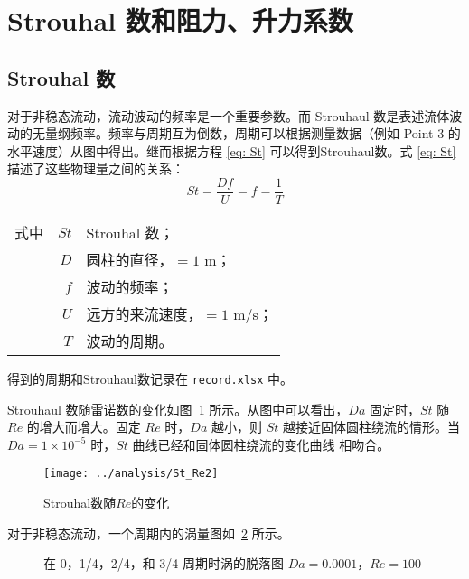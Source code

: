 \section{Strouhal 数和阻力、升力系数}

\subsection{Strouhal 数}

对于非稳态流动，流动波动的频率是一个重要参数。而 Strouhaul 数是表述流体波动的无量纲频率。频率与周期互为倒数，周期可以根据测量数据（例如 Point 3 的水平速度）从图中得出。继而根据方程 \eqref{eq: St} 可以得到Strouhaul数。式 \eqref{eq: St} 描述了这些物理量之间的关系：
\begin{equation}\label{eq: St}
	St = \frac{Df}{U} = f = \frac{1}{T}
\end{equation}
\begin{tabularx}{\textwidth}{@{}l@{\quad}r@{——}X@{}}
	式中 & $St$ & Strouhal 数；\\
		& $D$ & 圆柱的直径，$=1$ m；\\
		& $f$ & 波动的频率；\\
		& $U$ & 远方的来流速度，$=1$ m/s；\\
		& $T$ & 波动的周期。 
\end{tabularx}\vspace{3.15bp}
得到的周期和Strouhaul数记录在 \texttt{record.xlsx} 中。

Strouhaul 数随雷诺数的变化如图~\ref{fig: St} 所示。从图中可以看出，$Da$ 固定时，$St$ 随 $Re$ 的增大而增大。固定 $Re$ 时，$Da$ 越小，则 $St$ 越接近固体圆柱绕流的情形。当 $Da=1 \times 10^{-5}$ 时，$St$ 曲线已经和固体圆柱绕流的变化曲线 \cite{} 相吻合。

\begin{figure}
	\centering
	\texttt{[image: ../analysis/St\_Re2]}
	\caption{Strouhal数随$Re$的变化}
	\label{fig: St}
\end{figure}

对于非稳态流动，一个周期内的涡量图如~\ref{fig: 4*vortex} 所示。

\begin{figure}
	\centering
	\begin{minipage}{\textwidth}
		\centering
	\end{minipage}
	\centering
	\begin{minipage}{\textwidth}
		\centering
	\end{minipage}
	\caption{在 0，1/4，2/4，和 3/4 周期时涡的脱落图 $Da=0.0001$，$Re=100$}
	\label{fig: 4*vortex}
\end{figure}

